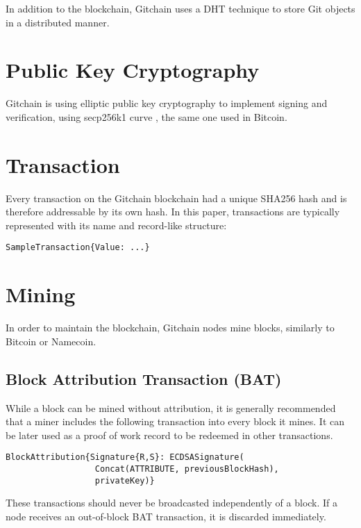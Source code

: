 \documentclass[a4paper]{article}
\begin{document}
In addition to the blockchain, Gitchain uses a DHT technique to store Git objects in a distributed manner.

\section{Public Key Cryptography}

Gitchain is using elliptic public key cryptography to implement signing and verification, using secp256k1 curve , the same one used in
Bitcoin.

\section{Transaction}

Every transaction on the Gitchain blockchain had a unique SHA256 hash and is therefore addressable by its own hash. In this paper, transactions are typically represented with its name and record-like structure:

\begin{verbatim}
SampleTransaction{Value: ...}
\end{verbatim}

\section{Mining}

In order to maintain the blockchain, Gitchain nodes mine blocks, similarly to Bitcoin or Namecoin.

\subsection{Block Attribution Transaction (BAT)}

While a block can be mined without attribution, it is generally recommended that a miner includes the following transaction into every block it mines. It can be later used as a proof of work record to be redeemed in other transactions.

\begin{verbatim}
BlockAttribution{Signature{R,S}: ECDSASignature(
                  Concat(ATTRIBUTE, previousBlockHash),
                  privateKey)}
\end{verbatim}

These transactions should never be broadcasted independently of a block. If a node receives an out-of-block BAT transaction, it is discarded immediately.
\end{document}
